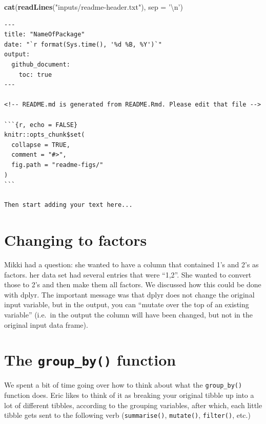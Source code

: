 \documentclass[]{book}
\newenvironment{Shaded}{\begin{snugshade}}{\end{snugshade}}
\newcommand{\KeywordTok}[1]{\textcolor[rgb]{0.13,0.29,0.53}{\textbf{{#1}}}}
\newcommand{\DataTypeTok}[1]{\textcolor[rgb]{0.13,0.29,0.53}{{#1}}}
\newcommand{\CharTok}[1]{\textcolor[rgb]{0.31,0.60,0.02}{{#1}}}
\newcommand{\StringTok}[1]{\textcolor[rgb]{0.31,0.60,0.02}{{#1}}}
\newcommand{\NormalTok}[1]{{#1}}
\theoremstyle{definition}
\theoremstyle{definition}
\theoremstyle{remark}
\begin{document}
\begin{Shaded}
\begin{Highlighting}[]
\KeywordTok{cat}\NormalTok{(}\KeywordTok{readLines}\NormalTok{(}\StringTok{"inputs/readme-header.txt"}\NormalTok{), }\DataTypeTok{sep =} \StringTok{'}\CharTok{\textbackslash{}n}\StringTok{'}\NormalTok{)}
\end{Highlighting}
\end{Shaded}

\begin{verbatim}
---
title: "NameOfPackage"
date: "`r format(Sys.time(), '%d %B, %Y')`"
output: 
  github_document:
    toc: true
---

<!-- README.md is generated from README.Rmd. Please edit that file -->

```{r, echo = FALSE}
knitr::opts_chunk$set(
  collapse = TRUE,
  comment = "#>",
  fig.path = "readme-figs/"
)
```

Then start adding your text here...
\end{verbatim}

\section{Changing to factors}\label{changing-to-factors}

Mikki had a question: she wanted to have a column that contained 1's and
2's as factors. her data set had several entries that were ``1,2''. She
wanted to convert those to 2's and then make them all factors. We
discussed how this could be done with dplyr. The important message was
that dplyr does not change the original input variable, but in the
output, you can ``mutate over the top of an existing variable'' (i.e.~in
the output the column will have been changed, but not in the original
input data frame).

\section{\texorpdfstring{The \texttt{group\_by()}
function}{The group\_by() function}}\label{the-group_by-function}

We spent a bit of time going over how to think about what the
\texttt{group\_by()} function does. Eric likes to think of it as
breaking your original tibble up into a lot of different tibbles,
according to the grouping variables, after which, each little tibble
gets sent to the following verb (\texttt{summarise()},
\texttt{mutate()}, \texttt{filter()}, etc.)
\end{document}
